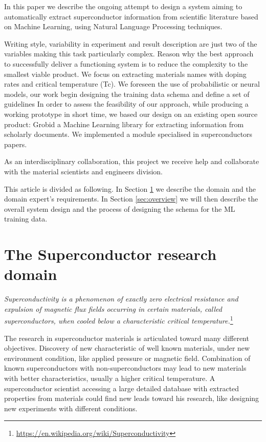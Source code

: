 \documentclass{article}
\begin{document}
In this paper we describe the ongoing attempt to design a system aiming to automatically extract superconductor information from scientific literature based on Machine Learning, using Natural Language Processing techniques.

Writing style, variability in experiment and result description are just two of the variables making this task particularly complex. Reason why the best approach to successfully deliver a functioning system is to reduce the complexity to the smallest viable product.
We focus on extracting materials names with doping rates and critical temperature (Tc). We foreseen the use of probabilistic or neural models, our work begin designing the training data schema and define a set of guidelines \cite{article} 
In order to assess the feasibility of our approach, while producing a working prototype in short time, we based our design on an existing open source product: Grobid \cite{GROBID} \cite{lopez2009grobid} a Machine Learning library for extracting information from scholarly documents. We implemented a module specialised in superconductors papers.

As an interdisciplinary collaboration, this project we receive help and collaborate with the material scientists and engineers division. 

This article is divided as following. In Section \ref{sec:requirements} we describe the domain and the domain expert's requirements. In Section \ref{sec:overview} we will then describe the overall system design and the process of designing the schema for the ML training data. 

\section{The Superconductor research domain}
\label{sec:requirements}

\textit{Superconductivity is a phenomenon of exactly zero electrical resistance and expulsion of magnetic flux fields occurring in certain materials, called superconductors, when cooled below a characteristic critical temperature.}\footnote{\url{https://en.wikipedia.org/wiki/Superconductivity}}

The research in superconductor materials is articulated toward many different objectives. Discovery of new characteristic of well known materials, under new environment condition, like applied pressure or magnetic field. Combination of known superconductors with non-superconductors may lead to new materials with better characteristics, usually a higher critical temperature. A superconductor scientist accessing a large detailed database with extracted properties from materials could find new leads toward his research, like designing new experiments with different conditions. 
\end{document}
